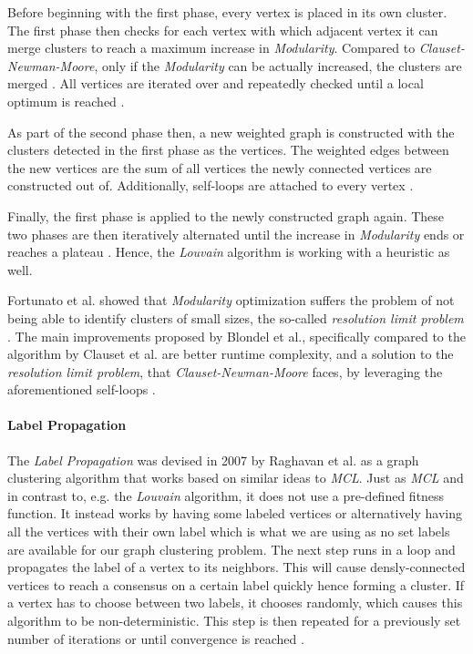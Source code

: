 \documentclass[12pt,a4paper]{report}
\begin{document}
Before beginning with the first phase, every vertex is placed in its own
cluster. The first phase then checks for each vertex with which adjacent vertex
it can merge clusters to reach a maximum increase in \textit{Modularity}.
Compared to \textit{Clauset-Newman-Moore}, only if the \textit{Modularity} can
be actually increased, the clusters are merged \cite{blondel2008modularity}.
All vertices are iterated over and repeatedly checked until a local optimum is
reached \cite{blondel2008modularity}.

As part of the second phase then, a new weighted graph is constructed with the
clusters detected in the first phase as the vertices. The weighted edges
between the new vertices are the sum of all vertices the newly connected
vertices are constructed out of. Additionally, self-loops are attached to every
vertex \cite{blondel2008modularity}.

Finally, the first phase is applied to the newly constructed graph again. These
two phases are then iteratively alternated until the increase in \textit{
Modularity} ends or reaches a plateau \cite{blondel2008modularity}. Hence, the
\textit{Louvain} algorithm is working with a heuristic as well.

Fortunato et al. showed that \textit{Modularity} optimization suffers the
problem of not being able to identify clusters of small sizes, the so-called
\textit{resolution limit problem} \cite{fortunato2007resolution}. The main
improvements proposed by Blondel et al., specifically compared to the algorithm
by Clauset et al. are better runtime complexity, and a solution to the \textit{
resolution limit problem}, that \textit{Clauset-Newman-Moore} faces, by
leveraging the aforementioned self-loops \cite{blondel2008modularity}.

\paragraph{Label Propagation \cite{raghavan2007lpa}}
The \textit{Label Propagation} was devised in 2007 by Raghavan et al.
as a graph clustering algorithm that works based on similar ideas to \textit{MCL}.
Just as \textit{MCL} and in contrast to, e.g. the \textit{Louvain} algorithm,
it does not use a pre\hyp defined fitness function.
It instead works by having some labeled
vertices or alternatively having all the vertices with their own label which is
what we are using as no set labels are available for our graph clustering
problem. The next step runs in a loop and propagates the label of a vertex to
its neighbors. This will cause densly\hyp connected vertices to reach a
consensus on a certain label quickly hence forming a cluster. If a vertex has
to choose between two labels, it chooses randomly, which causes this algorithm
to be non\hyp deterministic. This step is then repeated for a previously set
number of iterations or until convergence is reached \cite{raghavan2007lpa}.
\end{document}
